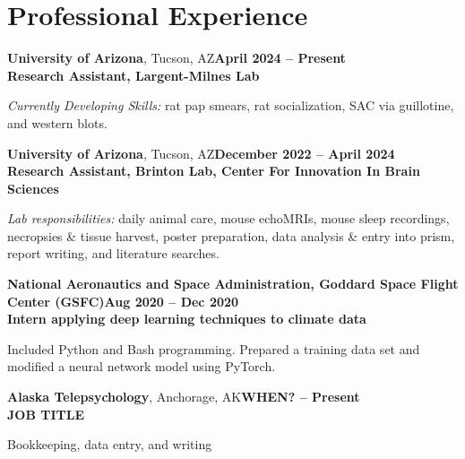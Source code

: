 \section{\mysidestyle Professional Experience}

\textbf{University of Arizona}, Tucson, AZ\hfill\textbf{April 2024 -- Present}\\
\textbf{Research Assistant, Largent-Milnes Lab}\hfill
\vspace{-3mm}\\\vspace{-1mm}
\begin{list2}
  \item \emph{Currently Developing Skills:} rat pap smears, rat socialization, SAC via guillotine, and western blots.
\end{list2}

\textbf{University of Arizona}, Tucson, AZ\hfill\textbf{December 2022 -- April 2024}\\
\textbf{Research Assistant, Brinton Lab, Center For Innovation In Brain Sciences}\hfill
\vspace{-3mm}\\\vspace{-1mm}
\begin{list2}
  \item \textit{Lab responsibilities:} daily animal care, mouse echoMRIs, mouse sleep recordings, necropsies \& tissue harvest, poster preparation, data analysis \& entry into prism, report writing, and literature searches.
\end{list2}

\textbf{National Aeronautics and Space Administration, Goddard Space Flight Center (GSFC)}\hfill\textbf{Aug 2020 -- Dec 2020}\\
\textbf{Intern applying deep learning techniques to climate data}\hfill
\vspace{-3mm}\\\vspace{-1mm}
\begin{list2}
  \item Included Python and Bash programming. Prepared a training data set and modified a neural network model using PyTorch.
 \end{list2}

\textbf{Alaska Telepsychology}, Anchorage, AK\hfill\textbf{WHEN? -- Present}\\
\textbf{JOB TITLE}\hfill
\vspace{-3mm}\\\vspace{-1mm}
\begin{list2}
  \item Bookkeeping, data entry, and writing
 \end{list2}

